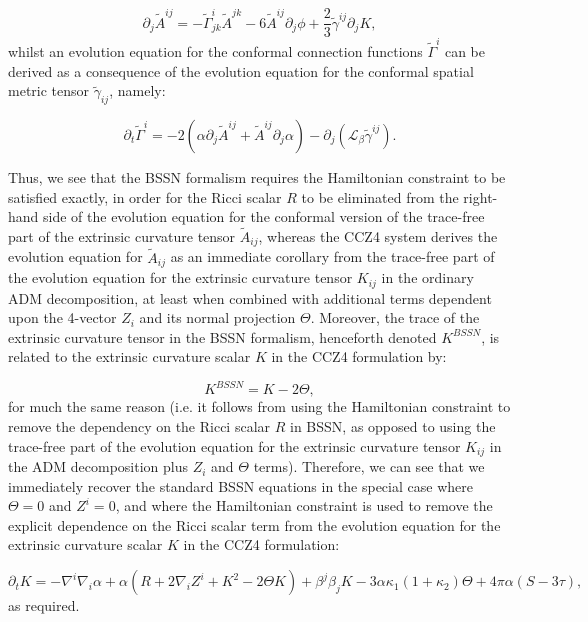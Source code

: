 \documentclass{article}
\begin{document}
\begin{equation}
\partial_j \tilde{A}^{i j} = - \tilde{\Gamma}_{j k}^{i} \tilde{A}^{j k} - 6 \tilde{A}^{i j} \partial_j \phi + \frac{2}{3} \tilde{\gamma}^{i j} \partial_j K,
\end{equation}
whilst an evolution equation for the conformal connection functions ${\tilde{\Gamma}^i}$ can be derived as a consequence of the evolution equation for the conformal spatial metric tensor ${\tilde{\gamma}_{i j}}$, namely:

\begin{equation}
\partial_t \tilde{\Gamma}^i = -2 \left( \alpha \partial_j \tilde{A}^{i j} + \tilde{A}^{i j} \partial_j \alpha \right) - \partial_j \left( \mathcal{L}_{\beta} \tilde{\gamma}^{i j} \right).
\end{equation}

Thus, we see that the BSSN formalism requires the Hamiltonian constraint to be satisfied exactly, in order for the Ricci scalar $R$ to be eliminated from the right-hand side of the evolution equation for the conformal version of the trace-free part of the extrinsic curvature tensor ${\tilde{A}_{i j}}$, whereas the CCZ4 system derives the evolution equation for ${\tilde{A}_{i j}}$ as an immediate corollary from the trace-free part of the evolution equation for the extrinsic curvature tensor ${K_{i j}}$ in the ordinary ADM decomposition, at least when combined with additional terms dependent upon the 4-vector ${Z_i}$ and its normal projection ${\Theta}$. Moreover, the trace of the extrinsic curvature tensor in the BSSN formalism, henceforth denoted ${K^{BSSN}}$, is related to the extrinsic curvature scalar $K$ in the CCZ4 formulation by:

\begin{equation}
K^{BSSN} = K - 2 \Theta,
\end{equation}
for much the same reason (i.e. it follows from using the Hamiltonian constraint to remove the dependency on the Ricci scalar $R$ in BSSN, as opposed to using the trace-free part of the evolution equation for the extrinsic curvature tensor ${K_{i j}}$ in the ADM decomposition plus ${Z_i}$ and ${\Theta}$ terms). Therefore, we can see that we immediately recover the standard BSSN equations in the special case where ${\Theta = 0}$ and ${Z^i = 0}$, and where the Hamiltonian constraint is used to remove the explicit dependence on the Ricci scalar term from the evolution equation for the extrinsic curvature scalar $K$ in the CCZ4 formulation:

\begin{equation}
\partial_t K = - \nabla^i \nabla_i \alpha + \alpha \left( R + 2 \nabla_i Z^i + K^2 - 2 \Theta K \right) + \beta^j \beta_j K - 3 \alpha \kappa_1 \left( 1 + \kappa_2 \right) \Theta + 4 \pi \alpha \left( S - 3 \tau \right),
\end{equation}
as required.
\end{document}
